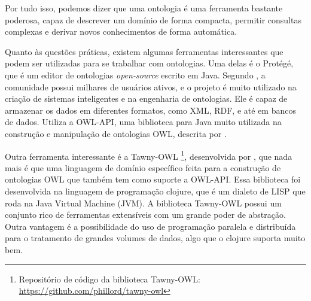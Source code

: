 Por tudo isso, podemos dizer que uma ontologia é uma ferramenta bastante poderosa, capaz de descrever um domínio de forma compacta, permitir consultas complexas e derivar novos conhecimentos de forma automática.

Quanto às questões práticas, existem algumas ferramentas interessantes que podem ser utilizadas para se trabalhar com ontologias. Uma delas é o Protégé, que é um editor de ontologias \textit{open-source} escrito em Java. Segundo \citet{noy2003protege}, a comunidade possui milhares de usuários ativos, e o projeto é muito utilizado na criação de sistemas inteligentes e na engenharia de ontologias. Ele é capaz de armazenar os dados em diferentes formatos, como XML, RDF, e até em bancos de dados. Utiliza a OWL-API, uma biblioteca para Java muito utilizada na construção e manipulação de ontologias OWL, descrita por \citet{Horridge:2011:OAJ:2019470.2019471}.

Outra ferramenta interessante é a Tawny-OWL \footnote{Repositório de código da biblioteca Tawny-OWL: \url{https://github.com/phillord/tawny-owl}}, desenvolvida por \citet{DBLP:journals/corr/abs-1303-0213}, que nada mais é que uma linguagem de domínio específico feita para a construção de ontologias OWL que também tem como suporte a OWL-API. Essa biblioteca foi desenvolvida na linguagem de programação clojure, que é um dialeto de LISP que roda na Java Virtual Machine (JVM). A biblioteca Tawny-OWL possui um conjunto rico de ferramentas extensíveis com um grande poder de abstração. Outra vantagem é a possibilidade do uso de programação paralela e distribuída para o tratamento de grandes volumes de dados, algo que o clojure suporta muito bem.
